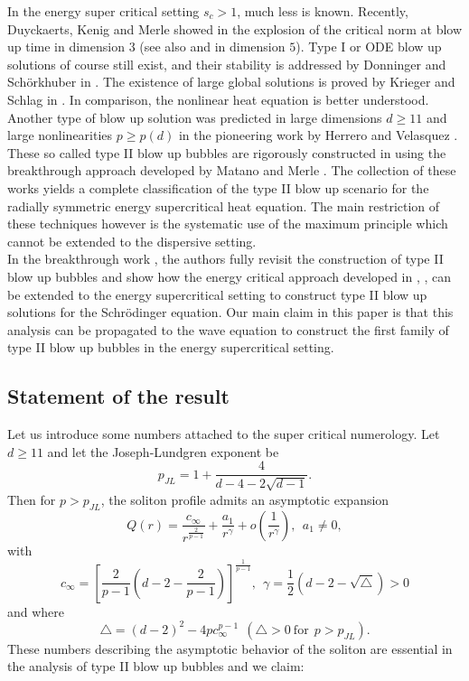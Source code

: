 \documentclass[11pt,a4paper,reqno]{amsart}
\theoremstyle{remark}
\numberwithin{equation}{section}
\begin{document}
In the energy super critical setting $s_c>1$, much less is known. Recently, Duyckaerts, Kenig and Merle showed in \cite{DKM} the explosion of the critical norm at blow up time in dimension $3$ (see also \cite{KM} and \cite{Dod} in dimension $5$). Type I or ODE blow up solutions of course still exist, and their stability is addressed by Donninger and Sch\"orkhuber in \cite{Donn}. The existence of large global solutions is proved by Krieger and Schlag in \cite{KS2}. In comparison, the nonlinear heat equation is better understood. Another type of blow up solution was predicted in large dimensions $d\ge 11$ and large nonlinearities $p\geq p(d)$ in the pioneering work by Herrero and Velasquez \cite{Velas}. These so called type II blow up bubbles are rigorously constructed in \cite{Mizo1, Mizo2} using the breakthrough approach developed by Matano and Merle \cite{MaM1,MaM2}. The collection of these works yields a complete classification of the type II blow up scenario for the radially symmetric energy supercritical heat equation. The main restriction of these techniques however is the systematic use of the maximum principle which cannot be extended to the dispersive setting. 
\\

\noindent In the breakthrough work \cite{MRRod2}, the authors fully revisit the construction of type II blow up bubbles and show how the energy critical approach developed in \cite{RaphRod}, \cite{MRRod1}, \cite{RSc1, RSc2} can be extended to the energy supercritical setting to construct type II blow up solutions for the Schr\"odinger equation. Our main claim in this paper is that this analysis can be propagated to the wave equation to construct the first family of type II blow up bubbles in the energy supercritical setting.

\subsection{Statement of the result}

Let us introduce some numbers attached to the super critical numerology. Let $d\geq 11$ and let the Joseph-Lundgren exponent be 
\begin{equation}
\label{exponentpjl}
p_{JL}=1+\frac{4}{d-4-2\sqrt{d-1}}.
\end{equation}
Then for $p>p_{JL}$, the soliton profile admits an asymptotic expansion \begin{equation}
  \label{expansionq}
  Q(r)=\frac{c_{\infty}}{r^{\frac{2}{p-1}}}+\frac{a_1}{r^{\gamma}}+o\left(\frac1{r^{\gamma}}\right), \ \ a_1\neq 0,
  \end{equation} 
  with 
 \begin{equation}
 \label{defgamma}
 c_\infty=\left[\frac{2}{p-1}\left(d-2-\frac 2{p-1}\right)\right]^{\frac 1{p-1}}, \ \ \gamma=\frac12(d-2-\sqrt{{\triangle}})>0
 \end{equation}
 and where $${\triangle}=(d-2)^2-4pc_{\infty}^{p-1}\ \ (\triangle>0 \  \mbox{for}\ \ p>p_{JL}).$$ These numbers describing the asymptotic behavior of the soliton are essential in the analysis of type II blow up bubbles and we claim:
\end{document}
